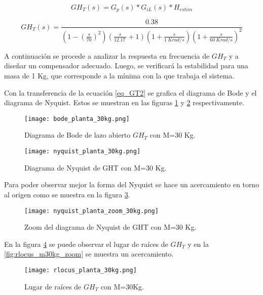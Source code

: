 \begin{equation*} \label{eq_GT1}
	GH_T(s)=G_{p}(s)*G_{iL}(s)*H_{estim} 
\end{equation*}

\begin{equation} \label{eq_GT2}
		GH_T(s)=\frac{0.38}{(1-(\frac{s}{70})^2)(\frac{s}{12.17\ }+1)(1+\frac{s}{1\ Krad/s}){(1+\frac{s}{60\ Krad/s})}^2 }	
\end{equation}

\noindent A continuación se procede a analizar la respuesta en frecuencia de $GH_T$ y a diseñar un compensador adecuado. Luego, se verificará la estabilidad para una masa de 1 Kg, que corresponde a la mínima con la que trabaja el sistema.


\noindent Con la transferencia de la ecuación  \ref{eq_GT2} se  grafica el diagrama de Bode y el diagrama de Nyquist. Estos se muestran en las figuras \ref{fig:Diag_Bode_lazo_abierto_30kg} y \ref{fig:Diag_Nyquist_lazo_abierto_30kg} respectivamente.

\begin{figure}[H]
	\centering
	\texttt{[image: bode\_planta\_30kg.png]}
	\caption{Diagrama de Bode de lazo abierto $GH_T$ con M=30 Kg.}
	\label{fig:Diag_Bode_lazo_abierto_30kg}
\end{figure}

\begin{figure}[H]
	\centering
	\texttt{[image: nyquist\_planta\_30kg.png]}
	\caption{Diagrama de Nyquist de GHT con M=30 Kg.}
	\label{fig:Diag_Nyquist_lazo_abierto_30kg}
\end{figure}

\noindent Para poder observar mejor la forma del Nyquist se hace un acercamiento en torno al origen como se muestra en la figura \ref{fig:Diag_Nyquist_lazo_abierto_zoom_30kg}.

\begin{figure}[H]
	\centering
	\texttt{[image: nyquist\_planta\_zoom\_30kg.png]}
	\caption{Zoom del diagrama de Nyquist de GHT con M=30 Kg.}
	\label{fig:Diag_Nyquist_lazo_abierto_zoom_30kg}
\end{figure}

\noindent En la figura \ref{fig:rlocus_m30kg} se puede observar el lugar de raíces de $GH_{T}$ y en la \ref{fig:rlocus_m30kg_zoom} se muestra un acercamiento.

\begin{figure}[H]
	\centering
	\texttt{[image: rlocus\_planta\_30kg.png]}
	\caption{Lugar de raíces de $GH_{T}$ con M=30Kg.}
	\label{fig:rlocus_m30kg}
\end{figure}

